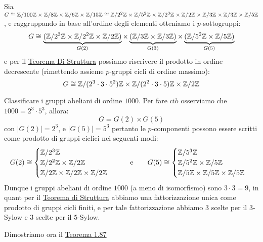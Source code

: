 \documentclass[11pt]{scrartcl}
\begin{document}
\begin{example}
    Sia $G \cong \mathbb{Z}/{100}\mathbb{Z} \times \mathbb{Z}/{8}\mathbb{Z} \times \mathbb{Z}/{6}\mathbb{Z} \times \mathbb{Z}/{15}\mathbb{Z} \cong \mathbb{Z}/{2^2}\mathbb{Z} \times \mathbb{Z}/{5^2}\mathbb{Z} \times \mathbb{Z}/{2^3}\mathbb{Z} \times \mathbb{Z}/{2}\mathbb{Z} \times \mathbb{Z}/{3}\mathbb{Z} \times \mathbb{Z}/{3}\mathbb{Z} \times \mathbb{Z}/{5}\mathbb{Z}$, e raggruppando in base all'ordine degli elementi
    otteniamo i $p$-sottogruppi:
        \[ G \cong \underbrace{(\mathbb{Z}/{2^3}\mathbb{Z} \times \mathbb{Z}/{2^2}\mathbb{Z} \times \mathbb{Z}/{2}\mathbb{Z})}_{G(2)} \times \underbrace{(\mathbb{Z}/{3}\mathbb{Z} \times \mathbb{Z}/{3}\mathbb{Z})}_{G(3)} \times \underbrace{(\mathbb{Z}/{5^2}\mathbb{Z} \times \mathbb{Z}/{5}\mathbb{Z})}_{G(5)}
            \]
    e per il \hyperref[t:struttura]{Teorema Di Struttura} possiamo riscrivere il prodotto in ordine decrescente (rimettendo assieme $p$-gruppi cicli di ordine massimo):
        \[ G \cong \mathbb{Z}/{(2^3\cdot 3 \cdot 5^2)}\mathbb{Z} \times \mathbb{Z}/{(2^2 \cdot 3 \cdot 5)}\mathbb{Z} \times \mathbb{Z}/{2}\mathbb{Z}
            \]
\end{example}

\begin{example}
    Classificare i gruppi abeliani di ordine $1000$. Per fare ciò osserviamo che $1000 = 2^3 \cdot 5^3$, allora:
    \[  G = G(2) \times G(5)
        \]
    con $|G(2)| = 2^3$, e $|G(5)| = 5^3$ pertanto le $p$-componenti possono essere scritti come prodotto di gruppi ciclici nei seguenti modi:
    \[ G(2) \cong \begin{cases}
                    \mathbb{Z}/{2^3}\mathbb{Z} \\
                    \mathbb{Z}/{2^2}\mathbb{Z} \times \mathbb{Z}/{2}\mathbb{Z} \\
                    \mathbb{Z}/{2}\mathbb{Z} \times \mathbb{Z}/{2}\mathbb{Z} \times \mathbb{Z}/{2}\mathbb{Z}
                \end{cases}
    \qquad \text e \qquad
    G(5) \cong \begin{cases}
        \mathbb{Z}/{5^3}\mathbb{Z} \\
        \mathbb{Z}/{5^2}\mathbb{Z} \times \mathbb{Z}/{5}\mathbb{Z} \\
        \mathbb{Z}/{5}\mathbb{Z} \times \mathbb{Z}/{5}\mathbb{Z} \times \mathbb{Z}/{5}\mathbb{Z}
    \end{cases}
        \]
    Dunque i gruppi abeliani di ordine $1000$ (a meno di isomorfismo) sono $3\cdot 3 = 9$, in quant per il \hyperref[t:struttura]{Teorema di Struttura} abbiamo
    una fattorizzazione unica come prodotto di gruppi cicli finiti, e per tale fattorizzazione abbiamo $3$ scelte per il $3$-Sylow e $3$ scelte per il $5$-Sylow.
\end{example}

Dimostriamo ora il \hyperref[t:t1]{Teorema 1.87}
\end{document}
